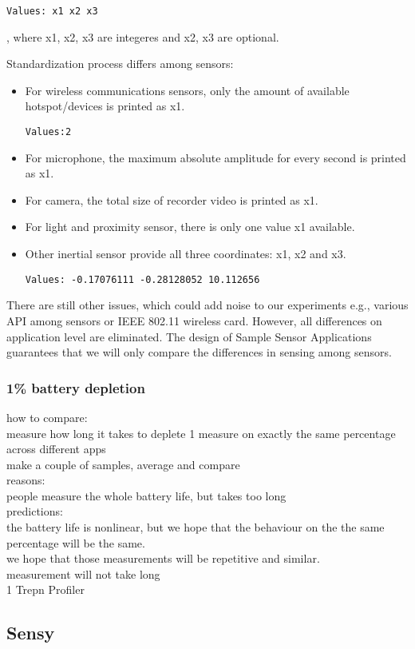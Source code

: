 \begin{lstlisting}[frame=single]
Values: x1 x2 x3
\end{lstlisting}, where x1, x2, x3 are integeres and x2, x3 are optional. 

Standardization process differs among sensors:
\begin{itemize}
	\item For wireless communications sensors, only the amount of available hotspot/devices is printed as x1. 
		\begin{lstlisting}[frame=single]
Values:2
		\end{lstlisting}
	\item For microphone, the maximum absolute amplitude for every second is printed as x1.
	\item For camera, the total size of recorder video is printed as x1.
	\item For light and proximity sensor, there is only one value x1 available.
	\item Other inertial sensor provide all three coordinates: x1, x2 and x3.
		\begin{lstlisting}[frame=single]
Values: -0.17076111 -0.28128052 10.112656
		\end{lstlisting}
\end{itemize}

There are still other issues, which could add noise to our experiments e.g., various API among sensors or IEEE 802.11 wireless card. However, all differences on application level are eliminated. The design of Sample Sensor Applications guarantees that we will only compare the differences in sensing among sensors.			
				
\subsubsection{1\% battery depletion}	
\label{s:design:measurements:method}			
how to compare:\\
	measure how long it takes to deplete 1%
		measure on exactly the same percentage across different apps\\
		make a couple of samples, average and compare\\
		reasons:\\
			people measure the whole battery life, but takes too long\\
			
			
		predictions:\\
			the battery life is nonlinear, but we hope that the behaviour on the the same percentage will be the same.\\
			we hope that those measurements will be repetitive and similar.\\
			measurement will not take long\\
			1%
	Trepn Profiler\\
			
			
		
		
		
\subsection{Sensy}
\label{s:design:sensy}
